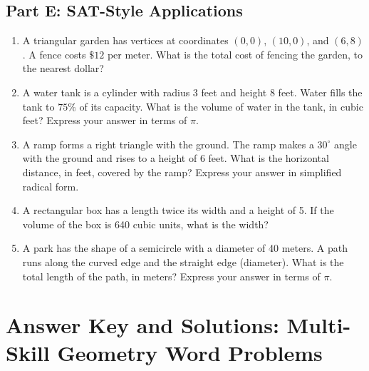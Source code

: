 \documentclass[14pt]{extarticle}
\begin{document}
\subsection*{Part E: SAT-Style Applications}
\begin{enumerate}
  \item A triangular garden has vertices at coordinates \((0, 0)\), \((10, 0)\), and \((6, 8)\). A fence costs \(\$12\) per meter. What is the total cost of fencing the garden, to the nearest dollar?
  \item A water tank is a cylinder with radius 3 feet and height 8 feet. Water fills the tank to \(75\%\) of its capacity. What is the volume of water in the tank, in cubic feet? Express your answer in terms of \(\pi\).
  \item A ramp forms a right triangle with the ground. The ramp makes a \(30^\circ\) angle with the ground and rises to a height of 6 feet. What is the horizontal distance, in feet, covered by the ramp? Express your answer in simplified radical form.
  \item A rectangular box has a length twice its width and a height of 5. If the volume of the box is 640 cubic units, what is the width?
  \item A park has the shape of a semicircle with a diameter of 40 meters. A path runs along the curved edge and the straight edge (diameter). What is the total length of the path, in meters? Express your answer in terms of \(\pi\).
\end{enumerate}

\newpage

\section*{Answer Key and Solutions: Multi-Skill Geometry Word Problems}
\end{document}
